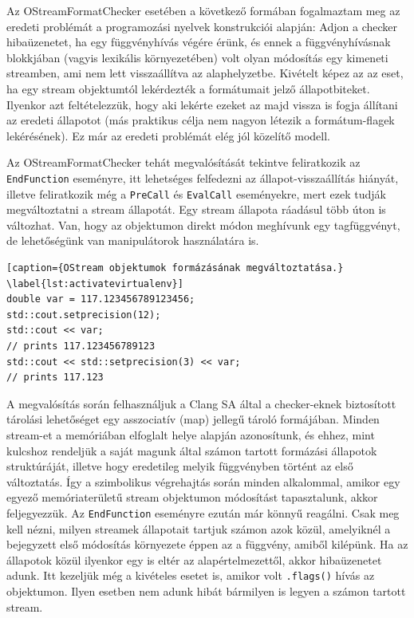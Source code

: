 \documentclass[a4paper,12pt]{report}
\begin{document}
Az OStreamFormatChecker esetében a következő formában fogalmaztam meg az eredeti problémát a programozási nyelvek konstrukciói alapján: Adjon a checker hibaüzenetet, ha egy függvényhívás végére érünk, és ennek a függvényhívásnak blokkjában (vagyis lexikális környezetében) volt olyan módosítás egy kimeneti streamben, ami nem lett visszaállítva az alaphelyzetbe. Kivételt képez az az eset, ha egy stream objektumtól lekérdezték a formátumait jelző állapotbiteket. Ilyenkor azt feltételezzük, hogy aki lekérte ezeket az majd vissza is fogja állítani az eredeti állapotot (más praktikus célja nem nagyon létezik a formátum-flagek lekérésének). Ez már az eredeti problémát elég jól közelítő modell.

Az OStreamFormatChecker tehát megvalósítását tekintve feliratkozik az \texttt{EndFunction} eseményre, itt lehetséges felfedezni az állapot-visszaállítás hiányát, illetve feliratkozik még a \texttt{PreCall} és \texttt{EvalCall} eseményekre, mert ezek tudják megváltoztatni a stream állapotát. Egy stream állapota ráadásul több úton is változhat. Van, hogy az objektumon direkt módon meghívunk egy tagfüggvényt, de lehetőségünk van manipulátorok használatára is.

\begin{lstlisting}[caption={OStream objektumok formázásának megváltoztatása.}
\label{lst:activatevirtualenv}]
double var = 117.123456789123456;
std::cout.setprecision(12);
std::cout << var;
// prints 117.123456789123
std::cout << std::setprecision(3) << var;
// prints 117.123
\end{lstlisting}

A megvalósítás során felhasználjuk a Clang SA által a checker-eknek biztosított tárolási lehetőséget egy asszociatív (map) jellegű tároló formájában. Minden stream-et a memóriában elfoglalt helye alapján azonosítunk, és ehhez, mint kulcshoz rendeljük a saját magunk által számon tartott formázási állapotok struktúráját, illetve hogy eredetileg melyik függvényben történt az első változtatás. Így a szimbolikus végrehajtás során minden alkalommal, amikor egy egyező memóriaterületű stream objektumon módosítást tapasztalunk, akkor feljegyezzük. Az \texttt{EndFunction} eseményre ezután már könnyű reagálni. Csak meg kell nézni, milyen streamek állapotait tartjuk számon azok közül, amelyiknél a bejegyzett első módosítás környezete éppen az a függvény, amiből kilépünk. Ha az állapotok közül ilyenkor egy is eltér az alapértelmezettől, akkor hibaüzenetet adunk. Itt kezeljük még a kivételes esetet is, amikor volt \texttt{.flags()} hívás az objektumon. Ilyen esetben nem adunk hibát bármilyen is legyen a számon tartott stream.
\end{document}
